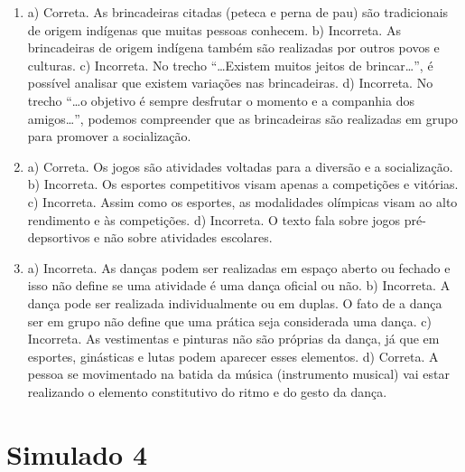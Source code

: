 

\begin{enumerate}

\item
a) Correta. As brincadeiras citadas (peteca e perna de pau) são tradicionais de origem indígenas que muitas pessoas
conhecem.
b) Incorreta. As brincadeiras de origem indígena também são
realizadas por outros povos e culturas.
c) Incorreta. No trecho “\ldots{}Existem muitos jeitos de
brincar\ldots{}”, é possível analisar que existem variações nas brincadeiras.
d) Incorreta. No trecho “\ldots{}o objetivo é sempre desfrutar o
momento e a companhia dos amigos\ldots{}”, podemos compreender que as
brincadeiras são realizadas em grupo para promover a socialização.

\item
a) Correta. Os jogos são atividades voltadas para a diversão e a socialização.
b) Incorreta. Os esportes competitivos visam apenas a competições e vitórias.
c) Incorreta. Assim como os esportes, as modalidades olímpicas
visam ao alto rendimento e às competições.
d) Incorreta. O texto fala sobre jogos pré-depsortivos e não
sobre atividades escolares.

\item
a) Incorreta. As danças podem ser realizadas em espaço aberto ou
fechado e isso não define se uma atividade é uma dança oficial ou não.
b) Incorreta. A dança pode ser realizada individualmente ou em
duplas. O fato de a dança ser em grupo não define que uma prática seja
considerada uma dança.
c) Incorreta. As vestimentas e pinturas não são próprias da
dança, já que em esportes, ginásticas e lutas podem aparecer esses elementos.
d) Correta. A pessoa se movimentado na batida da música
(instrumento musical) vai estar realizando o elemento constitutivo do
ritmo e do gesto da dança.
\end{enumerate}

\chapter{Simulado 4}

